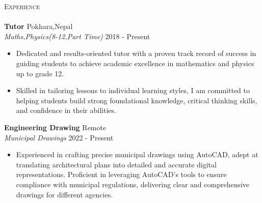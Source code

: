 \documentclass[a4paper]{article}
\newcommand{\lineunder} {
    \vspace*{-8pt} \\
    \hspace*{-18pt} \hrulefill \\
}
\newcommand{\header} [1] {
    {\hspace*{-18pt}\vspace*{6pt} \textsc{#1}}
    \vspace*{-6pt} \lineunder
}
\begin{document}
\header{Experience}
\textbf{Tutor} \hfill Pokhara,Nepal\\
\textit{Maths,Physics(8-12,Part Time)} \hfill 2018 - Present\\
\vspace{-1mm}
\begin{itemize} \itemsep 1pt
	\item Dedicated and results-oriented tutor with a proven track record of success in guiding students to achieve academic excellence in mathematics and physics up to grade 12. 
	\item Skilled in tailoring lessons to individual learning styles, I am committed to helping students build strong foundational knowledge, critical thinking skills, and confidence in their abilities. 
\end{itemize}
\textbf{Engineering Drawing} \hfill Remote\\
\textit{Municipal Drawings} \hfill 2022 - Present\\
\vspace{-1mm}
\begin{itemize} \itemsep 1pt
	\item Experienced in crafting precise municipal drawings using AutoCAD, adept at translating architectural plans into detailed and accurate digital representations. Proficient in leveraging AutoCAD's tools to ensure compliance with municipal regulations, delivering clear and comprehensive drawings for different agencies.
\end{itemize}
\end{document}
